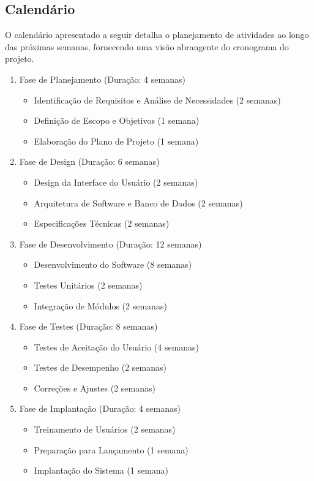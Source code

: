        \subsection{Calend\'{a}rio }
       O calendário apresentado a seguir detalha o planejamento de atividades ao longo das próximas semanas, fornecendo uma visão abrangente do cronograma do projeto.
\begin{enumerate}
	\item Fase de Planejamento (Duração: 4 semanas)
	\begin{itemize}
		\item Identificação de Requisitos e Análise de Necessidades (2 semanas)
		\item Definição de Escopo e Objetivos (1 semana)
		\item Elaboração do Plano de Projeto (1 semana)
	\end{itemize}

	\item Fase de Design (Duração: 6 semanas)
	\begin{itemize}
		\item Design da Interface do Usuário (2 semanas)
		\item Arquitetura de Software e Banco de Dados (2 semanas)
		\item Especificações Técnicas (2 semanas)
	\end{itemize}

	\item Fase de Desenvolvimento (Duração: 12 semanas)
\begin{itemize}
	\item Desenvolvimento do Software (8 semanas)
	\item Testes Unitários (2 semanas)
	\item Integração de Módulos (2 semanas)
\end{itemize}

	\item Fase de Testes (Duração: 8 semanas)
\begin{itemize}
	\item Testes de Aceitação do Usuário (4 semanas)
	\item Testes de Desempenho (2 semanas)
	\item Correções e Ajustes (2 semanas)
\end{itemize}

	\item Fase de Implantação (Duração: 4 semanas)
\begin{itemize}
	\item Treinamento de Usuários (2 semanas)
	\item Preparação para Lançamento (1 semana)
	\item Implantação do Sistema (1 semana)
\end{itemize}


\end{enumerate}
